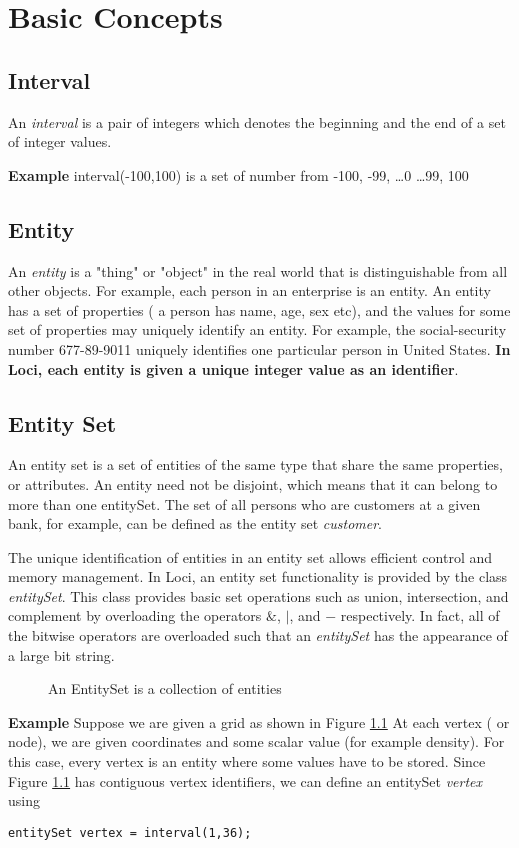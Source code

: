 \chapter{ Basic Concepts }

\section {Interval}
An {\em interval } is a pair of integers which denotes the beginning and the
end of a set of integer values.
\par {\bf Example } interval(-100,100) is a set of number from -100, -99, \dots 0 \dots 99, 100

%
\section{Entity}
\par  An {\em entity} is a "thing" or "object" in the real world that
is distinguishable from all other objects. For example, each person in 
an enterprise is an entity. An entity has a set of properties ( a person
has name, age, sex etc), and the
values for some set of properties may uniquely identify an entity. For
example, the social-security number 677-89-9011 uniquely identifies
one particular person in United States. {\bf In Loci, each entity is given
a unique integer value as an identifier}.
%
\section{Entity Set} 
\par An {entity set } is a set of entities of the same type that share 
the same properties, or attributes. An entity need not be disjoint, which means that 
it can belong to more than one entitySet.  The set of all persons who are
customers at a given bank, for example, can be defined as the entity
set {\em customer}.
%
\par The unique identification of entities in an entity set allows
efficient control and memory management. In Loci, an entity set functionality is provided by 
the class {\em entitySet}.  This class provides basic set operations such as union, 
intersection, and complement by overloading the operators ${\&}$, ${|}$, and ${-}$
respectively.  In fact, all of the bitwise operators are overloaded
such that an {\em entitySet} has the appearance of a large bit string.
%
\begin{figure}[ht]
\vspace{3.5in}\caption { An EntitySet is a collection of entities}
\label {FigEntitySet}
\end{figure}
%
\par{\bf Example} Suppose we are given a grid as shown in Figure \ref{FigEntitySet}
At each vertex ( or node), we are given coordinates and some scalar value
(for example density). For this case, every vertex is an entity where
some values have to be stored. 
%
Since Figure \ref{FigEntitySet} has contiguous vertex identifiers, we can define an
entitySet {\em vertex} using 
\begin{verbatim}
entitySet vertex = interval(1,36);
\end{verbatim}


